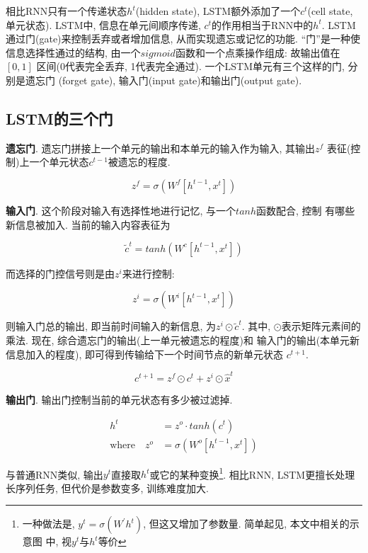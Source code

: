 \documentclass[UTF8, twocolumn]{ctexart}
\begin{document}
相比RNN只有一个传递状态$h^t$(hidden state), LSTM额外添加了一个$c^t$(cell 
state, 单元状态). LSTM中, 信息在单元间顺序传递, $c^t$的作用相当于RNN中的$h^t$. 
LSTM通过门(gate)来控制丢弃或者增加信息, 从而实现遗忘或记忆的功能. ``门''是一种使
信息选择性通过的结构, 由一个$sigmoid$函数和一个点乘操作组成: 故输出值在$[0,1]$
区间(0代表完全丢弃, 1代表完全通过). 一个LSTM单元有三个这样的门, 分别是遗忘门
(forget gate), 输入门(input gate)和输出门(output gate)\cite{1}.



\subsection{LSTM的三个门}
{\bf 遗忘门}. 遗忘门拼接上一个单元的输出和本单元的输入作为输入, 其输出$z^f$
表征(控制)上一个单元状态$c^{t-1}$被遗忘的程度.

\begin{equation}
z^f=\sigma(W^f[h^{t-1},x^t])
\end{equation}

{\bf 输入门}. 这个阶段对输入有选择性地进行记忆, 与一个$tanh$函数配合, 控制
有哪些新信息被加入. 当前的输入内容表征为

\begin{equation}
\widetilde{c}^t=tanh(W^c[h^{t-1},x^t])
\end{equation}

而选择的门控信号则是由$z^i$来进行控制:

\begin{equation}
z^i=\sigma(W^i[h^{t-1},x^t])
\end{equation}

则输入门总的输出, 即当前时间输入的新信息, 为$z^i \odot \widetilde{c}^t$. 其中, 
$\odot$表示矩阵元素间的乘法. 现在, 综合遗忘门的输出(上一单元被遗忘的程度)和
输入门的输出(本单元新信息加入的程度), 即可得到传输给下一个时间节点的新单元状态
$c^{t+1}$.

\begin{equation}
c^{t+1}=z^f \odot c^t + z^i \odot \widehat{x}^t
\end{equation}


{\bf 输出门}. 输出门控制当前的单元状态有多少被过滤掉. 

\begin{align}
h^t &= z^o \cdot tanh(c^t) \\
\text{where} \quad z^o &= \sigma(W^o[h^{t-1},x^t])
\end{align}

与普通RNN类似, 输出$y^t$直接取$h^t$或它的某种变换\footnote{一种做法是, 
$y^t=\sigma(W^{\prime}h^t)$, 但这又增加了参数量. 简单起见, 本文中相关的示意图
中, 视$y^t$与$h^t$等价}. 相比RNN, LSTM更擅长处理长序列任务, 但代价是参数变多, 
训练难度加大. 
\end{document}
